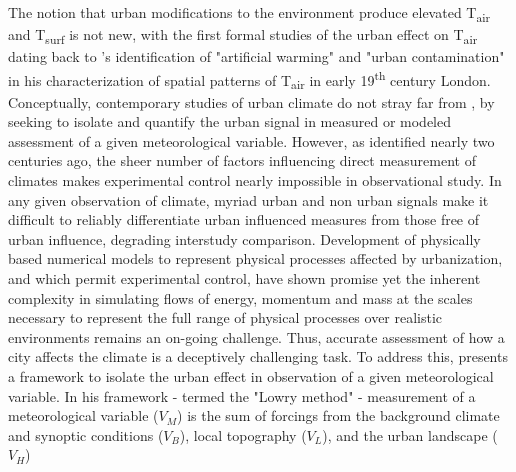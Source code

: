 \begin{bibunit}



The notion that urban modifications to the environment produce elevated T\textsubscript{air} and T\textsubscript{surf} is not new, with the first formal studies of the urban effect on T\textsubscript{air} dating back to \citet{Howard1833}'s identification of "artificial warming" and "urban contamination" in his characterization of spatial patterns of T\textsubscript{air} in early 19\textsuperscript{th} century London. Conceptually, contemporary studies of urban climate do not stray far from \citet{Howard1833}, by seeking to isolate and quantify the urban signal in measured or modeled assessment of a given meteorological variable. However, as \citet{Howard1833} identified nearly two centuries ago, the sheer number of factors influencing direct measurement of climates makes experimental control nearly impossible in observational study. In any given observation of climate, myriad urban and non urban signals make it difficult to reliably differentiate urban influenced measures from those free of urban influence, degrading interstudy comparison. Development of physically based numerical models to represent physical processes affected by urbanization, and which permit experimental control, have shown promise \citep{Krayenhoff2014,Gastellu-Etchegorry1996,Masson2000,Martilli2002} yet the inherent complexity in simulating flows of energy, momentum and mass at the scales necessary to represent the full range of physical processes over realistic environments remains an on-going challenge. Thus, accurate assessment of how a city affects the climate is a deceptively challenging task. To address this, \citet{Lowry1977} presents a framework to isolate the urban effect in observation of a given meteorological variable. In his framework - termed the "Lowry method" - measurement of a meteorological variable ($V_M$) is the sum of forcings from the background climate and synoptic conditions ($V_B$), local topography ($V_L$), and the urban landscape ($V_H$)


\end{bibunit}
